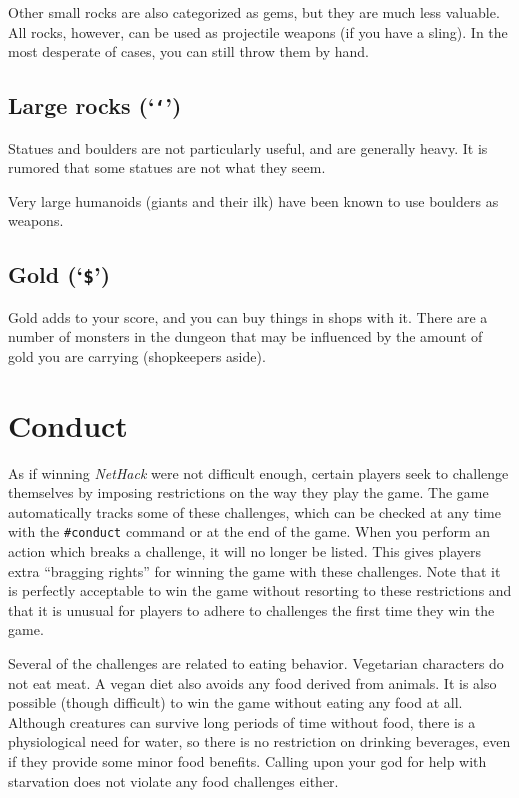 Other small rocks are also categorized as gems, but they are much less
valuable.  All rocks, however, can be used as projectile weapons (if you
have a sling).  In the most desperate of cases, you can still throw them
by hand.

\subsection*{Large rocks (`{\tt `}')}
Statues and boulders are not particularly useful, and are generally
heavy.  It is rumored that some statues are not what they seem.

Very large humanoids (giants and their ilk) have been known to use boulders
as weapons.

\subsection*{Gold (`{\tt \$}')}

Gold adds to your score, and you can buy things in shops with it.
There are a number
of monsters in the dungeon that may be influenced by the amount of gold
you are carrying (shopkeepers aside).

\section{Conduct}

As if winning {\it NetHack\/} were not difficult enough, certain players
seek to challenge themselves by imposing restrictions on the
way they play the game.  The game automatically tracks some of
these challenges, which can be checked at any time with the {\tt \#conduct}
command or at the end of the game.  When you perform an action which
breaks a challenge, it will no longer be listed.  This gives
players extra ``bragging rights'' for winning the game with these
challenges.  Note that it is perfectly acceptable to win the game
without resorting to these restrictions and that it is unusual for
players to adhere to challenges the first time they win the game.

Several of the challenges are related to eating behavior.
Vegetarian characters do not eat meat.  A vegan diet also avoids
any food derived from animals.  It is also possible (though difficult)
to win the game without eating any food at all.  Although creatures
can survive long periods of time without food, there is a physiological
need for water, so there is no restriction on drinking beverages,
even if they provide some minor food benefits.
Calling upon your god for help with starvation does
not violate any food challenges either.

